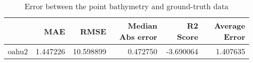 \begin{table}[h!]
\centering
\caption{Error between the point bathymetry and ground-truth data}
\label{tab:oahu2_lidar_error}
\begin{tabular}{lrrrrr}
\toprule
 & MAE & RMSE & Median Abs error & R2 Score & Average Error \\
\midrule
oahu2 & 1.447226 & 10.598899 & 0.472750 & -3.690064 & 1.407635 \\
\bottomrule
\end{tabular}
\end{table}
